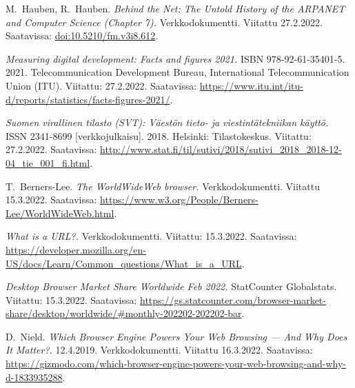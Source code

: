 \documentclass[finnish, 12pt, a4paper, elec, utf8, a-1b, online]{aaltothesis}
\begin{document}
\thesisbibliography
\begin{thebibliography}{99}

    M.\ Hauben, R.\ Hauben.
    \textit{Behind the Net: The Untold History of the ARPANET and Computer Science (Chapter 7).}
    Verkkodokumentti.
    Viitattu 27.2.2022.
    Saatavissa: \url{doi:10.5210/fm.v3i8.612}.

    \textit{Measuring digital development: Facts and figures 2021.}
    ISBN 978-92-61-35401-5.
    2021.
    Telecommunication Development Bureau, International Telecommunication Union (ITU).
    Viitattu: 27.2.2022.
    Saatavissa: \url{https://www.itu.int/itu-d/reports/statistics/facts-figures-2021/}.

    \textit{Suomen virallinen tilasto (SVT): Väestön tieto- ja viestintätekniikan käyttö.}
    ISSN 2341-8699 [verkkojulkaisu].
    2018.
    Helsinki: Tilastokeskus.
    Viitattu: 27.2.2022.
    Saatavissa: \url{http://www.stat.fi/til/sutivi/2018/sutivi_2018_2018-12-04_tie_001_fi.html}.

    T.\ Berners-Lee.
    \textit{The WorldWideWeb browser.}
    Verkkodokumentti.
    Viitattu 15.3.2022.
    Saatavissa: \url{https://www.w3.org/People/Berners-Lee/WorldWideWeb.html}.

    \textit{What is a URL?.}
    Verkkodokumentti.
    Viitattu: 15.3.2022.
    Saatavissa: \url{https://developer.mozilla.org/en-US/docs/Learn/Common_questions/What_is_a_URL}.

    \textit{Desktop Browser Market Share Worldwide Feb 2022.}
    StatCounter Globalstats.
    Viitattu: 15.3.2022.
    Saatavissa: \url{https://gs.statcounter.com/browser-market-share/desktop/worldwide/#monthly-202202-202202-bar}.

    D.\ Nield.
    \textit{Which Browser Engine Powers Your Web Browsing — And Why Does It Matter?.}
    12.4.2019.
    Verkkodokumentti.
    Viitattu 16.3.2022.
    Saatavissa: \url{https://gizmodo.com/which-browser-engine-powers-your-web-browsing-and-why-d-1833935288}.


\end{thebibliography}
\end{document}
